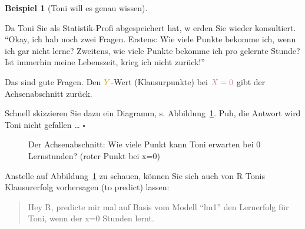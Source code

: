\documentclass[
  letterpaper,
]{scrbook}
\theoremstyle{definition}
\theoremstyle{definition}
\newtheorem{example}{Beispiel}[chapter]
\theoremstyle{definition}
\theoremstyle{remark}
\begin{document}
\begin{example}[Toni will es genau
wissen]\protect\hypertarget{exm-noten5}{}\label{exm-noten5}

Da Toni Sie als Statistik-Profi abgespeichert hat, w erden Sie wieder
konsultiert. \enquote{Okay, ich hab noch zwei Fragen. Erstens: Wie viele
Punkte bekomme ich, wenn ich gar nicht lerne? Zweitens, wie viele Punkte
bekomme ich pro gelernte Stunde? Ist immerhin meine Lebenszeit, krieg
ich nicht zurück!}

{Das sind gute Fragen. Den \(\color{ycol}{Y}\)-Wert (Klausurpunkte) bei
\(\color{xcol}{X}=0\) gibt der Achsenabschnitt zurück.}

Schnell skizzieren Sie dazu ein Diagramm, s. Abbildung~\ref{fig-beta0}.
Puh, die Antwort wird Toni nicht gefallen \ldots{} \(\square\)

\end{example}

\begin{figure}


\caption{\label{fig-beta0}Der Achsenabschnitt: Wie viele Punkt kann Toni
erwarten bei 0 Lernstunden? (roter Punkt bei x=0)}

\end{figure}%

Anstelle auf Abbildung~\ref{fig-beta0} zu schauen, können Sie sich auch
von R Tonis Klausurerfolg vorhersagen (to predict) lassen:

\begin{quote}
{} Hey R, predicte mir mal auf Basis vom Modell
\enquote{lm1} den Lernerfolg für Toni, wenn der x=0 Stunden lernt.
\end{quote}
\end{document}
